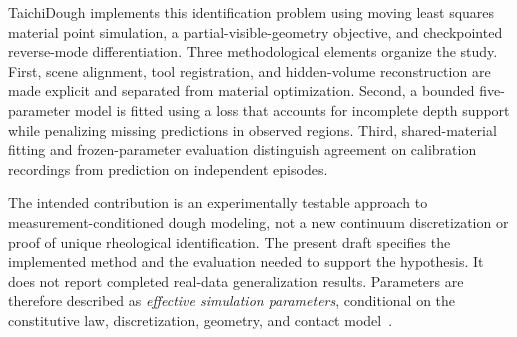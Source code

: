TaichiDough implements this identification problem using moving least squares material point simulation, a partial-visible-geometry objective, and checkpointed reverse-mode differentiation. Three methodological elements organize the study. First, scene alignment, tool registration, and hidden-volume reconstruction are made explicit and separated from material optimization. Second, a bounded five-parameter model is fitted using a loss that accounts for incomplete depth support while penalizing missing predictions in observed regions. Third, shared-material fitting and frozen-parameter evaluation distinguish agreement on calibration recordings from prediction on independent episodes.

The intended contribution is an experimentally testable approach to measurement-conditioned dough modeling, not a new continuum discretization or proof of unique rheological identification. The present draft specifies the implemented method and the evaluation needed to support the hypothesis. It does not report completed real-data generalization results. Parameters are therefore described as \emph{effective simulation parameters}, conditional on the constitutive law, discretization, geometry, and contact model~\cite{discrepancy2014}.

